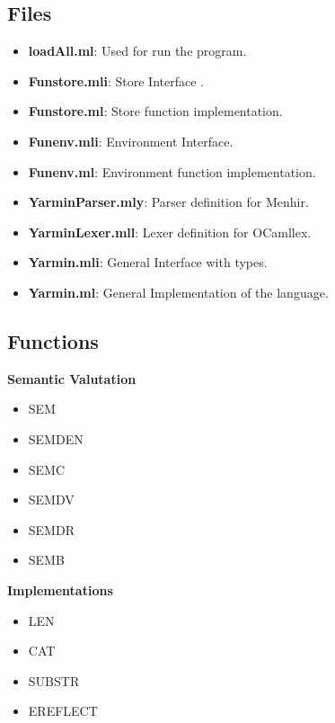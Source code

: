 \subsection{ Files }
\begin{itemize}
\item \textbf{loadAll.ml}: Used for run the program.\newline
\item \textbf{Funstore.mli}: Store Interface .\newline
\item \textbf{Funstore.ml}: Store function implementation.\newline
\item \textbf{Funenv.mli}: Environment Interface.\newline
\item \textbf{Funenv.ml}: Environment function implementation.\newline
\item \textbf{YarminParser.mly}: Parser definition for Menhir.\newline
\item \textbf{YarminLexer.mll}: Lexer definition for OCamllex.\newline
\item \textbf{Yarmin.mli}: General Interface with types.\newline
\item \textbf{Yarmin.ml}: General Implementation of the language.\newline

\end{itemize}


\subsection{ Functions }
	\textbf{Semantic Valutation}\newline
\begin{itemize}

	\item SEM \newline
	\item SEMDEN \newline
	\item SEMC \newline
	\item SEMDV \newline
	\item SEMDR \newline
	\item SEMB \newline
\end{itemize}
	\newpage
	\textbf{Implementations}\newline
\begin{itemize}
	\item LEN \newline
	\item CAT \newline
	\item SUBSTR \newline
	\item EREFLECT \newline
\end{itemize}	

